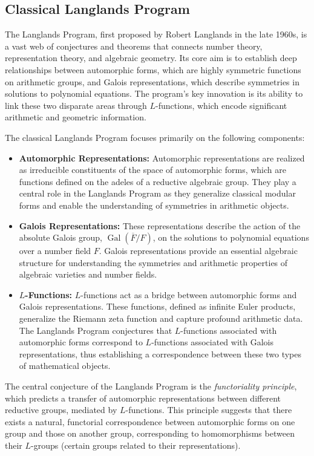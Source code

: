 \documentclass{article}
\theoremstyle{remark}
\begin{document}
\subsection{Classical Langlands Program}

The Langlands Program, first proposed by Robert Langlands in the late 1960s, is a vast web of conjectures and theorems that connects number theory, representation theory, and algebraic geometry. Its core aim is to establish deep relationships between automorphic forms, which are highly symmetric functions on arithmetic groups, and Galois representations, which describe symmetries in solutions to polynomial equations. The program’s key innovation is its ability to link these two disparate areas through $L$-functions, which encode significant arithmetic and geometric information.

The classical Langlands Program focuses primarily on the following components:
\begin{itemize}
    \item \textbf{Automorphic Representations:} Automorphic representations are realized as irreducible constituents of the space of automorphic forms, which are functions defined on the adeles of a reductive algebraic group. They play a central role in the Langlands Program as they generalize classical modular forms and enable the understanding of symmetries in arithmetic objects.
    
    \item \textbf{Galois Representations:} These representations describe the action of the absolute Galois group, $\operatorname{Gal}(\overline{F}/F)$, on the solutions to polynomial equations over a number field $F$. Galois representations provide an essential algebraic structure for understanding the symmetries and arithmetic properties of algebraic varieties and number fields.
    
    \item \textbf{$L$-Functions:} $L$-functions act as a bridge between automorphic forms and Galois representations. These functions, defined as infinite Euler products, generalize the Riemann zeta function and capture profound arithmetic data. The Langlands Program conjectures that $L$-functions associated with automorphic forms correspond to $L$-functions associated with Galois representations, thus establishing a correspondence between these two types of mathematical objects.
\end{itemize}

The central conjecture of the Langlands Program is the \textit{functoriality principle}, which predicts a transfer of automorphic representations between different reductive groups, mediated by $L$-functions. This principle suggests that there exists a natural, functorial correspondence between automorphic forms on one group and those on another group, corresponding to homomorphisms between their $L$-groups (certain groups related to their representations).
\end{document}
